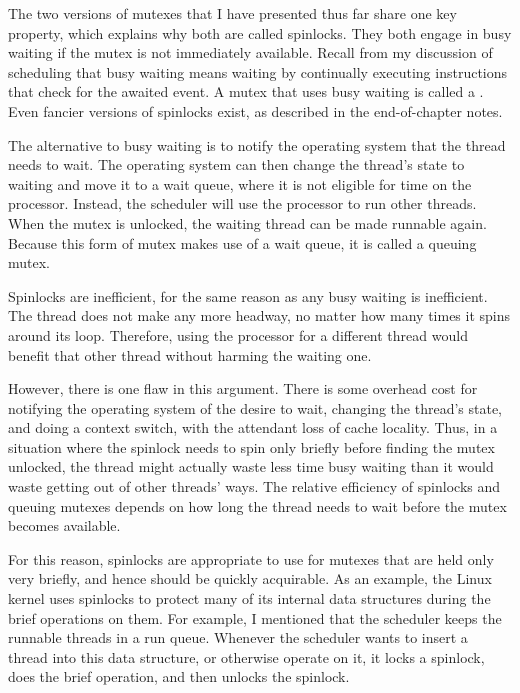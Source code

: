 The two versions of mutexes that I have presented thus far share one
key property, which explains why both are called spinlocks.
They both engage in busy waiting if the mutex
is not immediately available.  Recall from my discussion of scheduling
that busy waiting means waiting by continually executing instructions
that check for the awaited event.  A mutex that uses busy waiting is
called a .  Even fancier versions of spinlocks exist,
as described in the end-of-chapter notes.

The alternative to busy waiting is to notify the operating system that
the thread needs to wait.  The operating system can then change the
thread's state to waiting and move it to a
wait queue, where it is not eligible for time on the processor.
Instead, the scheduler will use the processor to run other threads.
When the mutex is unlocked, the waiting thread can be made runnable
again.  Because this form of mutex makes use of a wait queue, it is
called a queuing mutex.

Spinlocks are inefficient, for the same reason as any busy waiting is inefficient.
The thread does not make any more headway, no matter how many times it
spins around its loop.  Therefore, using the processor for a different
thread would benefit that other thread without harming the waiting
one.

However, there is one flaw in this argument.  There is some overhead
cost for notifying the operating system of the desire to wait,
changing the thread's state, and doing a context switch, with the
attendant loss of cache locality.  Thus, in a situation where the
spinlock needs to spin only briefly before finding the mutex unlocked,
the thread might actually waste less time busy waiting than it would waste
getting out of other threads' ways.  The relative efficiency of
spinlocks and queuing mutexes
depends on how long the thread needs to wait before the
mutex becomes available.

For this reason, spinlocks are appropriate to use for mutexes that are
held only very briefly, and hence should be quickly acquirable.
As an example, the Linux kernel uses spinlocks to protect many of its
internal data structures during the brief operations on them.  For
example, I mentioned that the scheduler keeps the runnable threads in
a run queue.  Whenever the scheduler wants to
insert a thread into this data structure, or otherwise operate on
it, it locks a spinlock, does the brief operation, and then
unlocks the spinlock.

